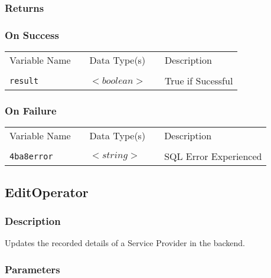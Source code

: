 \subsubsection{Returns}

\subsubsection{On Success}

\begin{tabular}{lllll}
Variable Name	&		&	Data Type(s)		&	&	Description	\\
				&	&	&	&	\\
\verb!result! & \hspace{15mm} & $<boolean>$ & \hspace{15mm} & True if Sucessful \\
\end{tabular}

\subsubsection{On Failure}

\begin{tabular}{lllll}
Variable Name	&		&	Data Type(s)		&	&	Description	\\
				&	&	&	&	\\
\verb!4ba8error! & \hspace{15mm} & $<string>$ & \hspace{15mm} & SQL Error Experienced \\
\end{tabular}


\subsection{EditOperator}

\subsubsection{Description}

Updates the recorded details of a Service Provider in the backend.

\subsubsection{Parameters}

